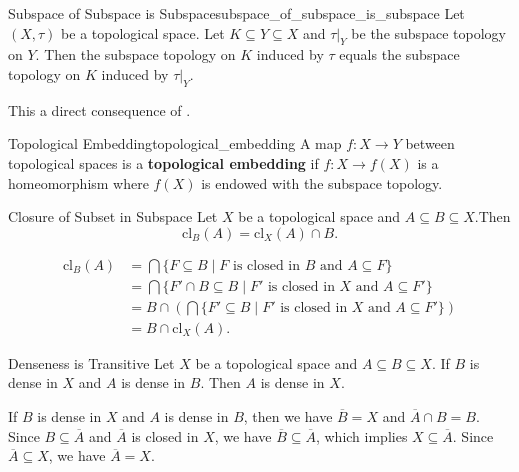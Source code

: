 \documentclass{report}
\begin{document}
\begin{proposition}{Subspace of Subspace is Subspace}{subspace_of_subspace_is_subspace}
	Let $(X, \tau)$ be a topological space. Let $K \subseteq Y \subseteq X$ and $\tau |_Y$ be the subspace topology on $Y$. Then the subspace topology on $K$ induced by $\tau$ equals the subspace topology on $K$ induced by $\tau|_Y$.
\end{proposition}
\begin{prf}
	This a direct consequence of .
\end{prf}

\begin{definition}{Topological Embedding}{topological_embedding}
	A map $f:X\to Y$ between topological spaces is a \textbf{topological embedding} if $f:X\to f(X)$ is a homeomorphism where $f(X)$ is endowed with the subspace topology.
\end{definition}


\begin{proposition}{Closure of Subset in Subspace}{}
	Let $X$ be a topological space and $A\subseteq B\subseteq X$.Then 
	\[
	\mathrm{cl}_{B}(A)=\mathrm{cl}_{X}(A)\cap B.
	\]
\end{proposition}
\begin{prf}
	\begin{align*}
		\mathrm{cl}_{B}(A)&=\bigcap\{F\subseteq B\mid F\text{ is closed in $B$ and }A\subseteq F\}\\
		&=\bigcap\{F'\cap B\subseteq B\mid F'\text{ is closed in $X$ and }A\subseteq F'\}\\
		&=B\cap\left(\bigcap \{F'\subseteq B\mid F'\text{ is closed in $X$ and }A\subseteq F'\}\right)\\
		&=B\cap \mathrm{cl}_{X}(A).
	\end{align*}
	
\end{prf}

\begin{proposition}{Denseness is Transitive}{}
	Let $X$ be a topological space and $A\subseteq B\subseteq X$. If $B$ is dense in $X$ and $A$ is dense in $B$. Then $A$ is dense in $X$.
\end{proposition}
\begin{prf}
	If $B$ is dense in $X$ and $A$ is dense in $B$, then we have $\overline{B}=X$ and $\overline{A}\cap B=B$. Since $B\subseteq \overline{A}$ and $\overline{A}$ is closed in $X$, we have $\overline{B}\subseteq \overline{A}$, which implies $X\subseteq \overline{A}$. Since $\overline{A}\subseteq X$, we have $\overline{A}=X$.
\end{prf}
\end{document}
